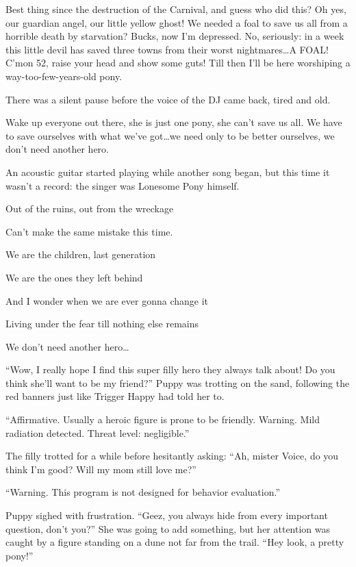 {\rt Best thing since the destruction of the Carnival, and guess who did this? Oh yes, our guardian angel, our little yellow ghost! We needed a foal to save us all from a horrible death by starvation? Bucks, now I'm depressed. No, seriously: in a week this little devil has saved three towns from their worst nightmares\dots A FOAL! C'mon 52, raise your head and show some guts! Till then I'll be here worshiping a way-too-few-years-old pony.}

There was a silent pause before the voice of the DJ came back, tired and old.

{\rt Wake up everyone out there, she is just one pony, she can't save us all. We have to save ourselves with what we've got\dots we need only to be better ourselves, we don't need another hero.}

An acoustic guitar started playing while another song began, but this time it wasn't a record: the singer was Lonesome Pony himself.

\begin{song}
Out of the ruins, out from the wreckage

Can't make the same mistake this time.

We are the children, last generation

We are the ones they left behind

And I wonder when we are ever gonna change it

Living under the fear till nothing else remains

We don't need another hero\dots
\end{song}

``Wow, I really hope I find this super filly hero they always talk about! Do you think she'll want to be my friend?'' Puppy was trotting on the sand, following the red banners just like Trigger Happy had told her to.

``{\mt Affirmative. Usually a heroic figure is prone to be friendly. Warning. Mild radiation detected. Threat level: negligible.}''

The filly trotted for a while before hesitantly asking: ``Ah, mister Voice, do you think I'm good? Will my mom still love me?''

``{\mt Warning. This program is not designed for behavior evaluation.}''

Puppy sighed with frustration. ``Geez, you always hide from every important question, don't you?'' She was going to add something, but her attention was caught by a figure standing on a dune not far from the trail. ``Hey look, a pretty pony!''


